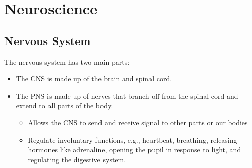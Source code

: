 \chapter{Neuroscience}
\label{cha:neuroscience}

\section{Nervous System}
The nervous system has two main parts:
\begin{itemize}
	\item The \ac{CNS} is made up of the brain and spinal cord.
	\item The \ac{PNS} is made up of nerves that branch off from the spinal cord and extend to all parts of the body.
	\begin{itemize}
		\item Allows the \ac{CNS} to send and receive signal to other parts or our bodies
		\item Regulate involuntary functions, e.g., heartbeat, breathing, releasing hormones like adrenaline, opening the pupil in response to light, and regulating the digestive system.
	\end{itemize}
\end{itemize}

